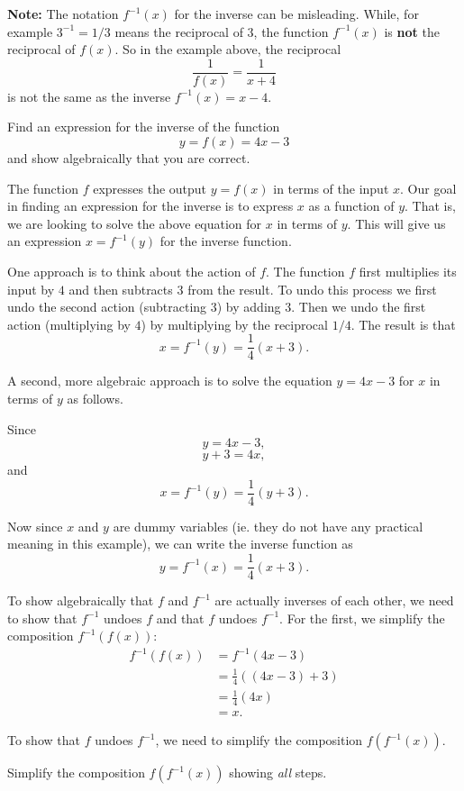 \documentclass{ximera}
\begin{document}
{\bf Note:} The notation $f^{-1}(x)$ for the inverse can be misleading. While, for example $3^{-1} = 1/3$ means the reciprocal of $3$, the function $f^{-1}(x)$ is {\bf not} the reciprocal of $f(x)$. So in the example above, the reciprocal
\[
     \frac{1}{f(x)} = \frac{1}{x+4} 
\] 
is not the same as the inverse $f^{-1}(x) = x-4$.


\begin{example}  \label{Ex:4577hhhh}
Find an expression for the inverse of the function
\[
    y= f(x) = 4x -3 
\]
and show algebraically that you are correct.

\begin{explanation}
The function $f$ expresses the output $y=f(x)$ in terms of the input $x$. Our goal in finding an expression for the inverse is to express  $x$ as a function of $y$. That is, we are looking to solve the above equation for $x$ in terms of $y$. This will give us an expression $x=f^{-1}(y)$ for the inverse function. 

One approach is to think about the action of $f$. The function $f$ first multiplies its input by $4$ and then subtracts $3$ from the result. To undo this process we first undo the second action (subtracting $3$) by adding $3$. Then we undo the first action (multiplying by $4$) by multiplying by the reciprocal $1/4$. The result is that
\[
     x =    f^{-1}(y) = \frac{1}{4} \left( x+3 \right) .
\] 

A second, more algebraic approach is to solve the equation $y=4x-3$ for $x$ in terms of $y$ as follows.

Since 
\[
    y = 4x - 3, 
\]
\[
         y + 3 = 4x ,
\]
and
\[
    x = f^{-1}(y) = \frac{1}{4}\left( y + 3 \right) .
\]

Now since $x$ and $y$ are dummy variables (ie. they do not have any practical meaning in this example), we can write the inverse function as 
\[
       y = f^{-1}(x) =  \frac{1}{4}\left( x+3 \right) .
\]

To show algebraically that $f$ and $f^{-1}$ are actually inverses of each other, we need to show that $f^{-1}$ undoes $f$ and that $f$ undoes $f^{-1}$. For the first, we simplify the composition $f^{-1}(f(x))$:
\begin{align*}
        f^{-1}(f(x)) &= f^{-1}(4x-3) \\
                          &= \frac{1}{4}\left( (4x-3)+3 \right) \\
                          &= \frac{1}{4}\left( 4x \right) \\
                          &= x .
\end{align*}

To show that $f$ undoes $f^{-1}$, we need to simplify the composition $f(f^{-1}(x))$.

\begin{question}  \label{Q343fggg}
Simplify the composition $f(f^{-1}(x))$ showing \emph{all} steps.
\end{question}
\end{explanation}
\end{example}
\end{document}
